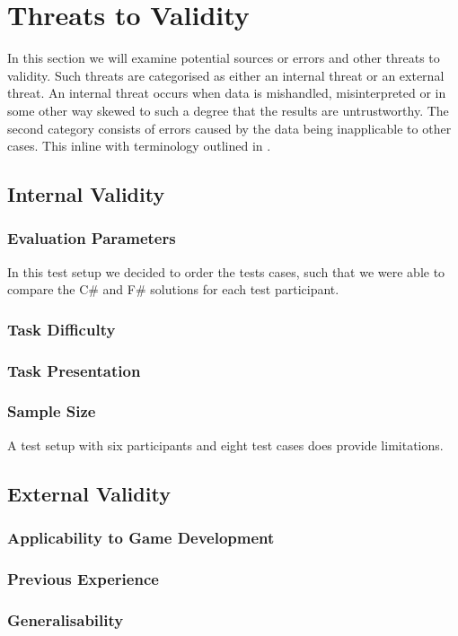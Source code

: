 \section{Threats to Validity} \label{sec:validity}
In this section we will examine potential sources or errors and other threats to validity. Such threats are categorised as either an internal threat or an external threat. An internal threat occurs when data is mishandled, misinterpreted or in some other way skewed to such a degree that the results are untrustworthy. The second category consists of errors caused by the data being inapplicable to other cases. This inline with terminology outlined in \cite{mcleod:validity}.


\subsection{Internal Validity}
\metasheep

\subsubsection{Evaluation Parameters}
In this test setup we decided to order the tests cases, such that we were able to compare the C\# and F\# solutions for each test participant.  

\subsubsection{Task Difficulty}

\subsubsection{Task Presentation}

\subsubsection{Sample Size}
A test setup with six participants and eight test cases does provide limitations.

\subsection{External Validity}
\metasheep

\subsubsection{Applicability to Game Development}

\subsubsection{Previous Experience}


\subsubsection{Generalisability}
